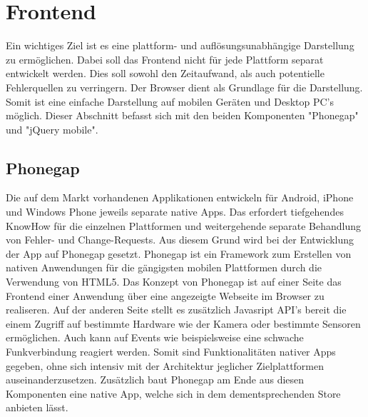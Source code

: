\documentclass[10pt, conference, compsocconf]{IEEEtran}
\begin{document}
\section{Frontend}
Ein wichtiges Ziel ist es eine plattform- und aufl\"osungsunabh\"angige Darstellung zu erm\"oglichen. 
Dabei soll das Frontend nicht f\"ur jede Plattform separat entwickelt werden.
Dies soll sowohl den Zeitaufwand, als auch potentielle Fehlerquellen zu verringern. 
Der Browser dient als Grundlage für die Darstellung. 
Somit ist eine einfache Darstellung auf mobilen Ger\"aten und Desktop PC's m\"oglich.
Dieser Abschnitt befasst sich mit den beiden Komponenten "Phonegap" und "jQuery mobile".

\subsection{Phonegap}
Die auf dem Markt vorhandenen Applikationen entwickeln f\"ur Android, iPhone und Windows Phone jeweils separate native Apps. 
Das erfordert tiefgehendes KnowHow f\"ur die einzelnen Plattformen und weitergehende separate Behandlung von Fehler- und Change-Requests. 
Aus diesem Grund wird bei der Entwicklung der App auf Phonegap gesetzt. Phonegap ist ein Framework zum Erstellen von nativen Anwendungen f\"ur die g\"angigsten mobilen Plattformen durch die Verwendung von HTML5.
Das Konzept von Phonegap ist auf einer Seite das Frontend einer Anwendung \"uber eine angezeigte Webseite im Browser zu realiseren. 
Auf der anderen Seite stellt es zus\"atzlich Javasript API's bereit die einem Zugriff auf bestimmte Hardware wie der Kamera oder bestimmte Sensoren erm\"oglichen. 
Auch kann auf Events wie beispielsweise eine schwache Funkverbindung reagiert werden. 
Somit sind Funktionalit\"aten nativer Apps gegeben, ohne sich intensiv mit der Architektur jeglicher Zielplattformen auseinanderzusetzen.
Zus\"atzlich baut Phonegap am Ende aus diesen Komponenten eine native App, welche sich in dem dementsprechenden Store anbieten l\"asst.
\end{document}

